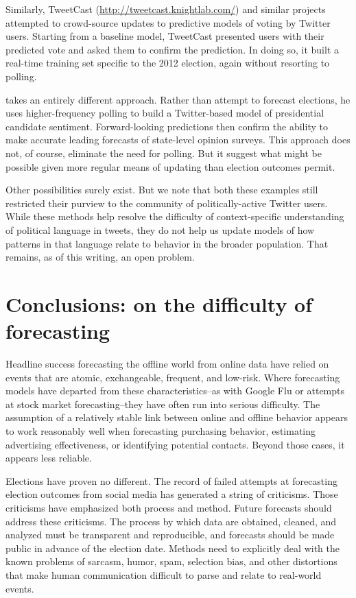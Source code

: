 \documentclass{article}
\begin{document}
Similarly, TweetCast (\url{http://tweetcast.knightlab.com/}) and
similar projects attempted to crowd-source updates to predictive
models of voting by Twitter users. Starting from a baseline model,
TweetCast presented users with their predicted vote and asked them to
confirm the prediction. In doing so, it built a real-time training set
specific to the 2012 election, again without resorting to polling. 

\cite{beauchamp2013} takes an entirely different approach. Rather than
attempt to forecast elections, he uses higher-frequency polling to
build a Twitter-based model of presidential candidate
sentiment. Forward-looking predictions then confirm the ability to
make accurate leading forecasts of state-level opinion surveys. This
approach does not, of course, eliminate the need for polling. But it
suggest what might be possible given more regular means of updating
than election outcomes permit.

Other possibilities surely exist. But we note that both these examples
still restricted their purview to the community of politically-active
Twitter users. While these methods help resolve the difficulty of
context-specific understanding of political language in tweets, they
do not help us update models of how patterns in that language relate
to behavior in the broader population. That remains, as of
this writing, an open problem.

\section{Conclusions: on the difficulty of forecasting}
\label{sec:concl-diff-forec}

Headline success forecasting the offline world from online data have
relied on events that are atomic, exchangeable, frequent, and
low-risk. Where forecasting models have departed from these
characteristics--as with Google Flu or attempts at stock market
forecasting--they have often run into serious difficulty. The
assumption of a relatively stable link between online and offline
behavior appears to work reasonably well when forecasting purchasing
behavior, estimating advertising effectiveness, or identifying
potential contacts. Beyond those cases, it appears less reliable.

Elections have proven no different. The record of failed attempts at
forecasting election outcomes from social media has generated a string
of criticisms. Those criticisms have emphasized both process and
method. Future forecasts should address these criticisms. The process
by which data are obtained, cleaned, and analyzed must be transparent
and reproducible, and forecasts should be made public in advance of
the election date. Methods need to explicitly deal with the known
problems of sarcasm, humor, spam, selection bias, and other
distortions that make human communication difficult to parse and
relate to real-world events. 
\end{document}
